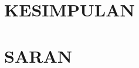 \vspace{1.5pc}
\vspace{1.5pc}
\begin{spacing}{1.5}
\section[Kesimpulan]{KESIMPULAN}

\lipsum[2-4]

\section[Saran]{SARAN}

\lipsum[2-4]\cite{Adams2011}

\end{spacing}